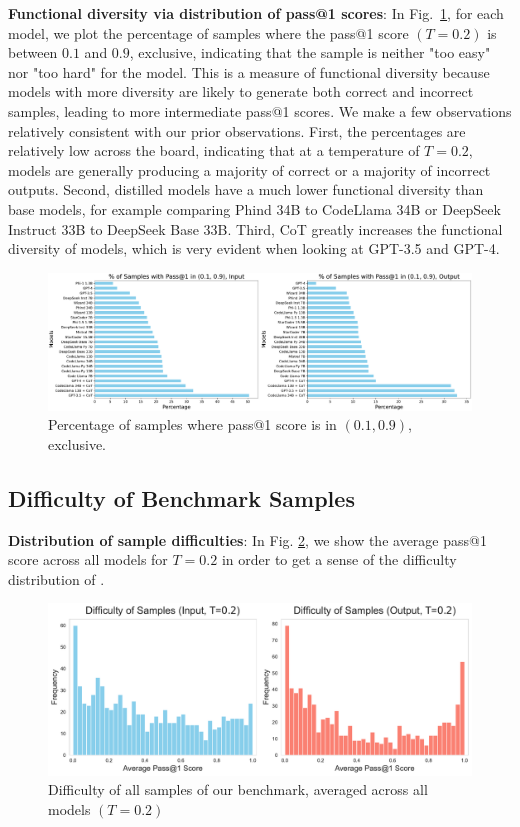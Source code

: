 \textbf{Functional diversity via distribution of pass@1 scores}: In Fig.~\ref{fig:sample-frequency-all}, for each model, we plot the percentage of samples where the pass@1 score $(T=0.2)$ is between $0.1$ and $0.9$, exclusive, indicating that the sample is neither "too easy" nor "too hard" for the model. This is a measure of functional diversity because models with more diversity are likely to generate both correct and incorrect samples, leading to more intermediate pass@1 scores. We make a few observations relatively consistent with our prior observations. First, the percentages are relatively low across the board, indicating that at a temperature of $T=0.2$, models are generally producing a majority of correct or a majority of incorrect outputs. Second, distilled models have a much lower functional diversity than base models, for example comparing Phind 34B to CodeLlama 34B or DeepSeek Instruct 33B to DeepSeek Base 33B. Third, CoT greatly increases the functional diversity of models, which is very evident when looking at GPT-3.5 and GPT-4. 

\begin{figure}[H]
     \centering
     \includegraphics[width=\textwidth]{figs/diversity/frequency_analysis.pdf}
     \caption{Percentage of samples where pass@1 score is in $(0.1, 0.9)$, exclusive.}
     \label{fig:sample-frequency-all}
\end{figure}

\subsection{Difficulty of Benchmark Samples}
\textbf{Distribution of sample difficulties}: In Fig. \ref{fig:benchmark-sample-difficulty}, we show the average pass@1 score across all models for $T=0.2$ in order to get a sense of the difficulty distribution of \benchmark.

\begin{figure}[h]
    \centering
    \includegraphics[width=\textwidth]{figs/benchmark/sample_difficulty_0.2.pdf}
    \caption{Difficulty of all samples of our benchmark, averaged across all models $(T=0.2)$}
    \label{fig:benchmark-sample-difficulty}
\end{figure}

